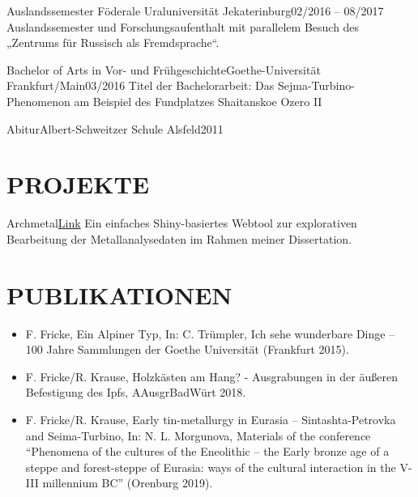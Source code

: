 \documentclass[10pt, a4paper]{article}
\begin{document}
\begin{cvitem}{Auslandssemester }{Föderale Uraluniversität} {Jekaterinburg}{02/2016 – 08/2017}
	Auslandssemester und Forschungsaufenthalt  mit parallelem Besuch des „Zentrums für Russisch als Fremdsprache“.
\end{cvitem}

\begin{cvitem}{Bachelor of Arts in Vor- und Frühgeschichte}{Goethe-Universität} {Frankfurt/Main}{03/2016}
	Titel der Bachelorarbeit: Das Sejma-Turbino-Phenomenon am Beispiel des Fundplatzes Shaitanskoe Ozero II
\end{cvitem}

\begin{cvitem}{Abitur}{Albert-Schweitzer Schule} {Alsfeld}{2011}
\end{cvitem}


\section{PROJEKTE}


\begin{projitem}{Archmetal}{\href{https://archmetal.shinyapps.io/Metal/}{Link}}
    Ein einfaches Shiny-basiertes Webtool zur explorativen Bearbeitung der Metallanalysedaten im Rahmen meiner Dissertation.
\end{projitem}

\section{PUBLIKATIONEN}

\begin{itemize}
	\item F. Fricke, Ein Alpiner Typ, In: C. Trümpler, Ich sehe wunderbare Dinge – 100 Jahre Sammlungen der Goethe Universität (Frankfurt 2015).
	\item F. Fricke/R. Krause, Holzkästen am Hang? - Ausgrabungen in der äußeren Befestigung des Ipfs, AAusgrBadWürt 2018.
	\item F. Fricke/R. Krause, Early tin-metallurgy in Eurasia – Sintashta-Petrovka and Seima-Turbino, In: N. L. Morgunova, Materials of the conference “Phenomena of the cultures of the Eneolithic – the Early bronze age of a steppe and forest-steppe of Eurasia: ways of the cultural interaction in the V-III millennium BC” (Orenburg 2019).
\end{itemize}


\fincols
\end{document}
